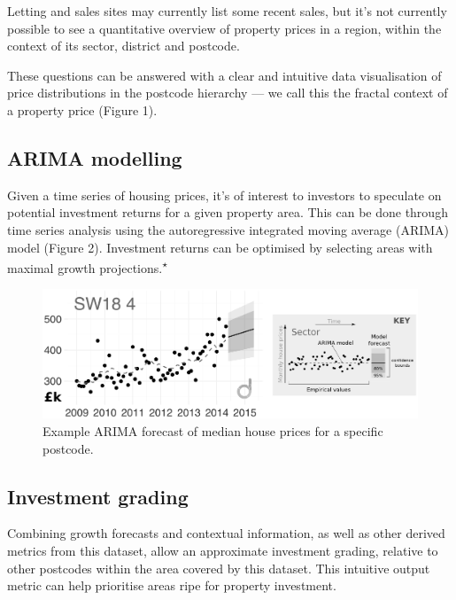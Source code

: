 \documentclass[
10pt, %
a4paper, %
oneside, %
headinclude,footinclude, %
BCOR5mm, %
]{scrartcl}
\begin{document}
Letting and sales sites may currently list some recent sales, but it's
not currently possible to see a quantitative overview of property
prices in a region, within the context of its sector, district and
postcode.

These questions can be answered with a clear and intuitive data
visualisation of price distributions in the postcode hierarchy --- we
call this the fractal context of a property price (Figure 1).

\subsection{ARIMA modelling}

Given a time series of housing prices, it's of interest to investors
to speculate on potential investment returns for a given property
area. This can be done through time series analysis using the
autoregressive integrated moving average (ARIMA) model (Figure
2). Investment returns can be optimised by selecting areas with
maximal growth projections.\textsuperscript{$\star$} \\

\begin{figure}[h]
\begin{center}
\includegraphics[width=.9\textwidth]{Figures/arima.png}
\caption{Example ARIMA forecast of median house prices for a specific postcode.}
\end{center}
\end{figure}

\vspace{-2em}
\subsection{Investment grading}

Combining growth forecasts and contextual information, as well as
other derived metrics from this dataset, allow an approximate
investment grading, relative to other postcodes within the area
covered by this dataset. This intuitive output metric can help
prioritise areas ripe for property investment. \\
\end{document}
